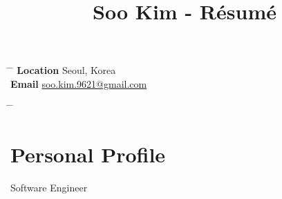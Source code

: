 \documentclass[10pt]{article} %
\begin{document}

\title{Soo Kim - Résumé} %


\parbox[c][3em][c]{0.5\textwidth}{ %
\begin{tabbing} %
\hspace{4cm} \= \hspace{4cm} \= \kill %
\textbf{Location} \> Seoul, Korea\\ %
\textbf{Email} \> \href{mailto:soo.kim.9621@gmail.com}{soo.kim.9621@gmail.com}\\ %
\end{tabbing}
}
\hfill %
\parbox[c][3em][c]{0.5\textwidth}{ %
\begin{tabbing} %
\hspace{4cm} \= \hspace{4cm} \= \kill %
\\
\end{tabbing}}


\section{Personal Profile}

Software Engineer


\end{document}
